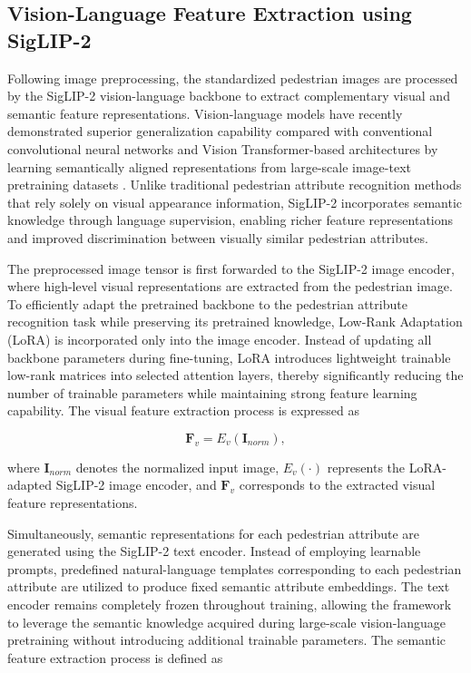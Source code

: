 \documentclass{ieeeaccess}
\begin{document}
\subsection{Vision-Language Feature Extraction using SigLIP-2}

Following image preprocessing, the standardized pedestrian images are processed by the SigLIP-2 vision-language backbone to extract complementary visual and semantic feature representations. Vision-language models have recently demonstrated superior generalization capability compared with conventional convolutional neural networks and Vision Transformer-based architectures by learning semantically aligned representations from large-scale image-text pretraining datasets \cite{bib6,bib7,bib11}. Unlike traditional pedestrian attribute recognition methods that rely solely on visual appearance information, SigLIP-2 incorporates semantic knowledge through language supervision, enabling richer feature representations and improved discrimination between visually similar pedestrian attributes.

The preprocessed image tensor is first forwarded to the SigLIP-2 image encoder, where high-level visual representations are extracted from the pedestrian image. To efficiently adapt the pretrained backbone to the pedestrian attribute recognition task while preserving its pretrained knowledge, Low-Rank Adaptation (LoRA) is incorporated only into the image encoder. Instead of updating all backbone parameters during fine-tuning, LoRA introduces lightweight trainable low-rank matrices into selected attention layers, thereby significantly reducing the number of trainable parameters while maintaining strong feature learning capability. The visual feature extraction process is expressed as

\begin{equation}
\mathbf{F}_{v}=E_{v}(\mathbf{I}_{norm}),
\label{eq:visual_features}
\end{equation}

where $\mathbf{I}_{norm}$ denotes the normalized input image, $E_{v}(\cdot)$ represents the LoRA-adapted SigLIP-2 image encoder, and $\mathbf{F}_{v}$ corresponds to the extracted visual feature representations.

Simultaneously, semantic representations for each pedestrian attribute are generated using the SigLIP-2 text encoder. Instead of employing learnable prompts, predefined natural-language templates corresponding to each pedestrian attribute are utilized to produce fixed semantic attribute embeddings. The text encoder remains completely frozen throughout training, allowing the framework to leverage the semantic knowledge acquired during large-scale vision-language pretraining without introducing additional trainable parameters. The semantic feature extraction process is defined as
\end{document}
